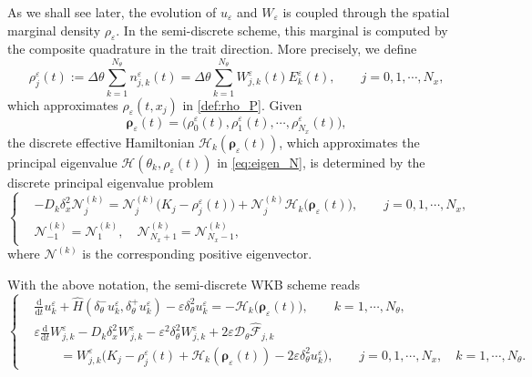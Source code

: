 \documentclass[11pt]{article}
\numberwithin{equation}{section}
\begin{document}
As we shall see later, the evolution of \(u_\varepsilon\) and
\(W_\varepsilon\) is coupled through the spatial marginal density $\rho_\varepsilon$.  In the
semi-discrete scheme, this marginal is computed by the composite quadrature in
the trait direction.  More precisely, we define
\begin{equation}\label{eq:E_rho}
\rho_{j}^\varepsilon(t)
:=
\Delta\theta
\sum_{k=1}^{N_\theta}
n_{j,k}^\varepsilon(t)
=
\Delta\theta
\sum_{k=1}^{N_\theta}
W_{j,k}^\varepsilon(t)E_k^\varepsilon(t),
\qquad
j=0, 1,\cdots, N_x, 
\end{equation}
which approximates $\rho_{\varepsilon}(t, x_j)$ in \eqref{def:rho_P}. 
Given
\[
\boldsymbol\rho_\varepsilon(t)
=
\bigl(\rho_{0}^\varepsilon(t), \rho_{1}^\varepsilon(t),\cdots,\rho_{N_x}^\varepsilon(t)\bigr),
\]
the discrete effective Hamiltonian
\(\mathcal H_k(\boldsymbol\rho_\varepsilon(t))\), which approximates the principal eigenvalue $\mathcal H(\theta_k, \rho_\varepsilon(t))$ in \eqref{eq:eigen_N}, is determined by the discrete
principal eigenvalue problem
\begin{equation}\label{eq:eigen_discrete}
\left\{
\begin{aligned}
&-D_k\delta_x^2\mathcal N_j^{(k)}
=
\mathcal N_j^{(k)}
\bigl(K_j-\rho_{j}^\varepsilon(t)\bigr)
+
\mathcal N_j^{(k)}
\mathcal H_k\bigl(\boldsymbol\rho_\varepsilon(t)\bigr),
\qquad
j=0, 1,\cdots,N_x, \\
& \mathcal N_{-1}^{(k)} = \mathcal N_{1}^{(k)}, \quad \mathcal N_{N_x+1}^{(k)} = \mathcal N_{N_x-1}^{(k)}, 
\end{aligned}
\right.
\end{equation}
where \(\mathcal N^{(k)}\) is the corresponding positive eigenvector. 

With the above notation, the semi-discrete WKB scheme reads
\begin{equation}\label{eq:semi_discrete_WKB_system}
\left\{
\begin{aligned}
&\frac{\mathrm d}{\mathrm dt}u_k^\varepsilon
+
\widehat H
\left(
\delta_\theta^-u_k^\varepsilon,
\delta_\theta^+u_k^\varepsilon
\right)
-
\varepsilon\delta_\theta^2u_k^\varepsilon
=
-\mathcal H_k\bigl(\boldsymbol\rho_\varepsilon(t)\bigr),
\qquad
k=1,\cdots,N_\theta,
\\[1mm]
&\varepsilon
\frac{\mathrm d}{\mathrm dt}W_{j,k}^\varepsilon
-
D_k\delta_x^2W_{j,k}^\varepsilon
-
\varepsilon^2\delta_\theta^2W_{j,k}^\varepsilon
+
2\varepsilon
\mathcal D_\theta
\widehat{\mathcal F}_{j,k}
\\
&\qquad =
W_{j,k}^\varepsilon
\bigl(
K_j-\rho_{j}^\varepsilon(t)
+\mathcal H_k(\boldsymbol\rho_\varepsilon(t))
-2\varepsilon\delta_\theta^2u_k^\varepsilon
\bigr),
\qquad
j=0, 1,\cdots,N_x,\quad k=1,\cdots,  N_\theta.
\end{aligned}
\right.
\end{equation}
\end{document}
